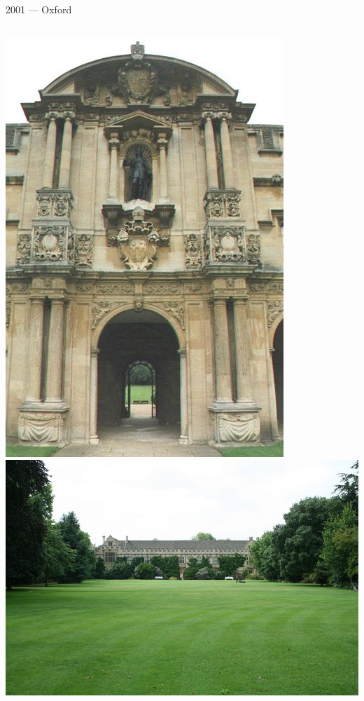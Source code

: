 \documentclass[t,xcolor={usenames,dvipsnames}]{beamer}
\begin{document}
\begin{frame}{2001 --- Oxford}
\begin{columns}[T]
\includegraphics[width=.99\textwidth]{sjc1}
\hspace{.07\textwidth}
\includegraphics[width=.9\textwidth]{sjc2}

\end{columns}
\end{frame}
\end{document}
